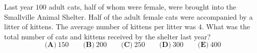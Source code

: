 Last year $100$ adult cats, half of whom were female, were brought into the Smallville Animal Shelter. Half of the adult female cats were accompanied by a litter of kittens. The average number of kittens per litter was $4$. What was the total number of cats and kittens received by the shelter last year?
\[\textbf{(A)}\ 150\qquad\textbf{(B)}\ 200\qquad\textbf{(C)}\ 250\qquad\textbf{(D)}\ 300\qquad\textbf{(E)}\ 400\]
